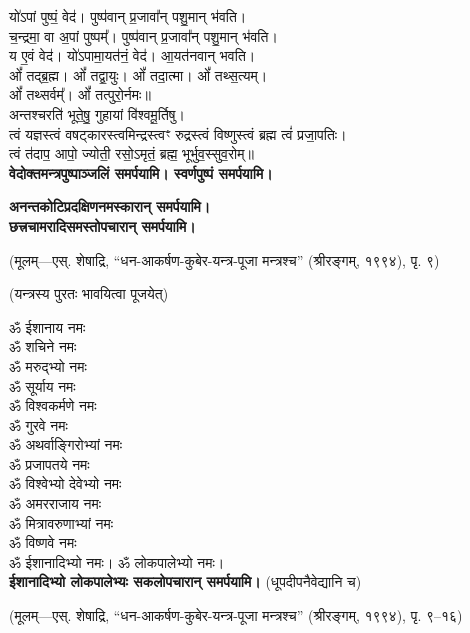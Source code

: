\begin{center}
यो॑ऽपां पुष्पं॒ वेद॑। पुष्प॑वान् प्र॒जावा᳚न् पशु॒मान् भ॑वति।\\
च॒न्द्रमा॒ वा अ॒पां पुष्पम्᳚। पुष्प॑वान् प्र॒जावा᳚न् पशु॒मान् भ॑वति।\\
य ए॒वं वेद॑। यो॑ऽपामा॒यत॑नं॒ वेद॑। आ॒यत॑नवान् भवति।\\

ओं᳚ तद्ब्र॒ह्म। ओं᳚ तद्वा॒युः। ओं᳚ तदा॒त्मा। ओं᳚ तथ्स॒त्यम्‌।\\
ओं᳚ तथ्सर्वम्᳚‌। ओं᳚ तत्पुरो॒र्नमः॥\\

अन्तश्चरति॑ भूते॒षु॒ गुहायां वि॑श्वमू॒र्तिषु।\\
त्वं यज्ञस्त्वं वषट्कारस्त्वमिन्द्रस्त्वꣳ रुद्रस्त्वं विष्णुस्त्वं ब्रह्म त्वं॑ प्रजा॒पतिः।\\
त्वं त॑दाप॒ आपो॒ ज्योती॒ रसो॒ऽमृतं॒ ब्रह्म॒ भूर्भुव॒स्सुव॒रोम्‌॥\\

\textbf{\devAya{} वेदोक्तमन्त्रपुष्पाञ्जलिं समर्पयामि। स्वर्णपुष्पं समर्पयामि।}

\textbf{\devAya{} अनन्तकोटिप्रदक्षिणनमस्कारान् समर्पयामि।}\\

\textbf{\devAya{} छत्त्रचामरादिसमस्तोपचारान् समर्पयामि।}\\

\end{center}

\centerline{\small{(मूलम्—एस्. शेषाद्रि, ``धन-आकर्षण-कुबेर-यन्त्र-पूजा मन्त्रश्च'' (श्रीरङ्गम्, १९९४), पृ. ९)}}

(यन्त्रस्य पुरतः भावयित्वा पूजयेत्)

ॐ ईशानाय नमः\\
ॐ शचिने नमः\\
ॐ मरुद्भ्यो नमः\\
ॐ सूर्याय नमः\\
ॐ विश्वकर्मणे नमः\\
ॐ गुरवे नमः\\
ॐ अथर्वाङ्गिरोभ्यां नमः\\
ॐ प्रजापतये नमः\\
ॐ विश्वेभ्यो देवेभ्यो नमः\\
ॐ अमरराजाय नमः\\
ॐ मित्रावरुणाभ्यां नमः\\
ॐ विष्णवे नमः\\
ॐ ईशानादिभ्यो नमः। ॐ लोकपालेभ्यो नमः।\\
\textbf{ईशानादिभ्यो लोकपालेभ्यः सकलोपचारान् समर्पयामि।} (धूपदीपनैवेद्यानि च)

\centerline{\small{(मूलम्—एस्. शेषाद्रि, ``धन-आकर्षण-कुबेर-यन्त्र-पूजा मन्त्रश्च'' (श्रीरङ्गम्, १९९४), पृ. ९–१६)}}
\renewcommand{\devAya}{श्री-कुबेराय नमः,}

